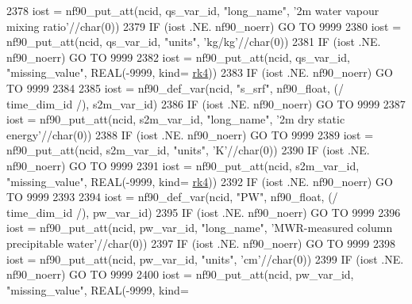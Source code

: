\begin{DoxyCode}
{{{{{{2378     iost    = nf90\_put\_att(ncid, qs\_var\_id, \textcolor{stringliteral}{"long\_name"}, \textcolor{stringliteral}{'2m water vapour mixing ratio'}//char(0))
2379     \textcolor{keywordflow}{IF} (iost .NE. nf90\_noerr) \textcolor{keywordflow}{GO TO} 9999
2380     iost    = nf90\_put\_att(ncid, qs\_var\_id, \textcolor{stringliteral}{"units"}, \textcolor{stringliteral}{'kg/kg'}//char(0))
2381     \textcolor{keywordflow}{IF} (iost .NE. nf90\_noerr) \textcolor{keywordflow}{GO TO} 9999
2382     iost    = nf90\_put\_att(ncid, qs\_var\_id, \textcolor{stringliteral}{"missing\_value"}, \textcolor{keywordtype}{REAL}(-9999, kind=
      \hyperlink{namespaceportable_abaed22a509442771d3fba69bebda0b33}{rk4}))
2383     \textcolor{keywordflow}{IF} (iost .NE. nf90\_noerr) \textcolor{keywordflow}{GO TO} 9999
2384 
2385     iost    = nf90\_def\_var(ncid, \textcolor{stringliteral}{"s\_srf"}, nf90\_float, (/ time\_dim\_id /), s2m\_var\_id)
2386     \textcolor{keywordflow}{IF} (iost .NE. nf90\_noerr) \textcolor{keywordflow}{GO TO} 9999
2387     iost    = nf90\_put\_att(ncid, s2m\_var\_id, \textcolor{stringliteral}{"long\_name"}, \textcolor{stringliteral}{'2m dry static energy'}//char(0))
2388     \textcolor{keywordflow}{IF} (iost .NE. nf90\_noerr) \textcolor{keywordflow}{GO TO} 9999
2389     iost    = nf90\_put\_att(ncid, s2m\_var\_id, \textcolor{stringliteral}{"units"}, \textcolor{stringliteral}{'K'}//char(0))
2390     \textcolor{keywordflow}{IF} (iost .NE. nf90\_noerr) \textcolor{keywordflow}{GO TO} 9999
2391     iost    = nf90\_put\_att(ncid, s2m\_var\_id, \textcolor{stringliteral}{"missing\_value"}, \textcolor{keywordtype}{REAL}(-9999, kind=
      \hyperlink{namespaceportable_abaed22a509442771d3fba69bebda0b33}{rk4}))
2392     \textcolor{keywordflow}{IF} (iost .NE. nf90\_noerr) \textcolor{keywordflow}{GO TO} 9999
2393 
2394     iost    = nf90\_def\_var(ncid, \textcolor{stringliteral}{"PW"}, nf90\_float, (/ time\_dim\_id /), pw\_var\_id)
2395     \textcolor{keywordflow}{IF} (iost .NE. nf90\_noerr) \textcolor{keywordflow}{GO TO} 9999
2396     iost    = nf90\_put\_att(ncid, pw\_var\_id, \textcolor{stringliteral}{"long\_name"}, \textcolor{stringliteral}{'MWR-measured column precipitable water'}//char(0))
2397     \textcolor{keywordflow}{IF} (iost .NE. nf90\_noerr) \textcolor{keywordflow}{GO TO} 9999
2398     iost    = nf90\_put\_att(ncid, pw\_var\_id, \textcolor{stringliteral}{"units"}, \textcolor{stringliteral}{'cm'}//char(0))
2399     \textcolor{keywordflow}{IF} (iost .NE. nf90\_noerr) \textcolor{keywordflow}{GO TO} 9999
2400     iost    = nf90\_put\_att(ncid, pw\_var\_id, \textcolor{stringliteral}{"missing\_value"}, \textcolor{keywordtype}{REAL}(-9999, kind=
}}}}}}
\end{DoxyCode}

